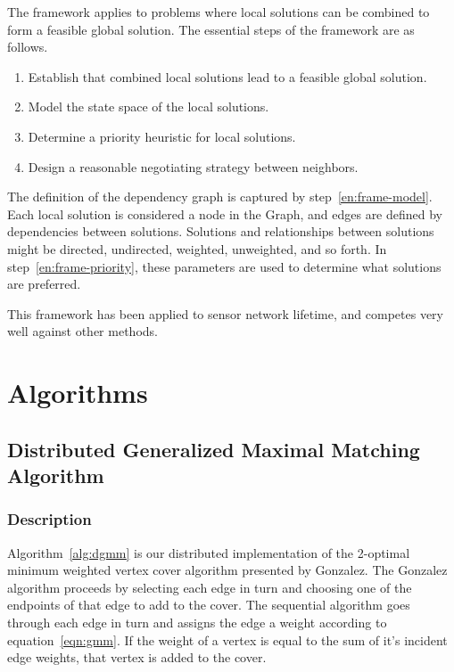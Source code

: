 The framework applies to problems where local solutions can be combined to form a feasible global solution. The essential steps of the framework are as follows. 
\begin{enumerate}
\item Establish that combined local solutions lead to a feasible global solution.
\item Model the state space of the local solutions. \label{en:frame-model}
\item Determine a priority heuristic for local solutions.\label{en:frame-priority}
\item Design a reasonable negotiating strategy between neighbors.
\end{enumerate} 

The definition of the dependency graph is captured by step~\ref{en:frame-model}. Each local solution is considered a node in the Graph, and edges are defined by dependencies between solutions. Solutions and relationships between solutions might be directed, undirected, weighted, unweighted, and so forth. In step~\ref{en:frame-priority}, these parameters are used to determine what solutions are preferred. 

This framework has been applied to sensor network lifetime, and competes very well against other methods\cite{Dhawan:hipc-09}.

\section{Algorithms}
\label{sec:algorithms}

\subsection{Distributed Generalized Maximal Matching Algorithm}
\subsubsection{Description}
Algorithm~\ref{alg:dgmm} is our distributed implementation of the 2-optimal minimum weighted vertex cover algorithm presented by Gonzalez.\cite{Gonzalez1995129} The Gonzalez algorithm proceeds by selecting each edge in turn and choosing one of the endpoints of that edge to add to the cover. The sequential algorithm goes through each edge in turn and assigns the edge a weight according to equation~\ref{eqn:gmm}. If the weight of a vertex is equal to the sum of it's incident edge weights, that vertex is added to the cover. 

